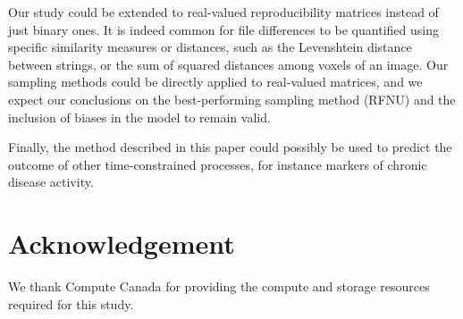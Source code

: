 \documentclass[10pt, conference, compsocconf]{IEEEtran}
\begin{document}
Our study could be extended to real-valued reproducibility 
matrices instead of just binary ones. It is indeed common for file 
differences to be quantified using specific similarity measures or 
distances, such as the Levenshtein distance between strings, or the sum of 
squared distances among voxels of an image. Our sampling methods 
could be directly applied to real-valued matrices, and we expect our 
conclusions on the best-performing sampling method (RFNU) and 
the inclusion of biases in the model to remain valid.


Finally, the method described in this paper could possibly be used to predict 
the outcome of other time-constrained processes, for instance 
markers of chronic disease activity.




\section*{Acknowledgement}

We thank Compute Canada for providing the compute and storage resources
required for this study.



\end{document}

